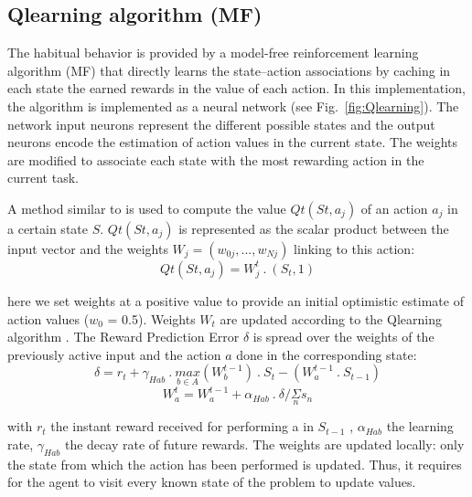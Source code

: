 \documentclass[english,a4paper,11pt,twoside]{StyleThese}
\begin{document}
\subsection{Qlearning algorithm (MF)}

The habitual behavior is provided by a model-free reinforcement learning algorithm (MF) that directly learns the state–action associations by caching in each state the earned rewards in the value of each action. In this implementation, the algorithm is implemented as a neural network (see Fig.~\ref{fig:Qlearning}). The network input neurons represent the different possible states and the output neurons encode the estimation of action values in the current state. The weights are modified to associate each state with the most rewarding action in the current task.

A method similar to \cite{brafman2002r} is used to compute the value $Qt(St, a_j)$ of an action $a_j$ in a certain state $S$. $Qt(St, a_j)$ is represented as the scalar product between the input vector and the weights $W_j = (w_{0j} , . . . , w_{Nj})$ linking to this action:
$$Qt(St, a_j) = W_j^t \ . \ (S_t, 1)$$

here we set weights at a positive value to provide an initial optimistic estimate of action values ($w_0$ = 0.5). Weights $W_t$ are updated according to the Qlearning algorithm \cite{watkins1989learning}. The Reward Prediction Error $\delta$ is spread over the weights of the previously active input and the action $a$ done in the corresponding state:
$$\delta = r_t + \gamma_{Hab} \ . \ \underset{b \in A}{max}(W_b^{t-1}) \ . \ S_t - (W_a^{t-1} \ . \ S_{t-1})$$
$$W_a^t = W_a^{t-1} + \alpha_{Hab} \ . \ \delta / \underset{n}{\Sigma}s_{n}$$

with $r_t$ the instant reward received for performing a in $S_{t−1}$ , $\alpha_{Hab}$ the learning rate, $\gamma_{Hab}$ the decay rate of future rewards. The weights are updated locally: only the state from which the action has been performed is updated. Thus, it requires for the agent to visit every known state of the problem to update values.
\end{document}
